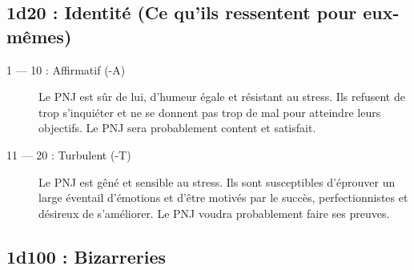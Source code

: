 \documentclass{article}
\begin{document}
\subsection*{1d20 : Identité (Ce qu'ils ressentent pour eux-mêmes)}

\begin{description}
	\item[1 --- 10 : Affirmatif (-A)] Le PNJ est sûr de lui, d'humeur égale et résistant au stress. Ils refusent de trop s'inquiéter et ne se donnent pas trop de mal pour atteindre leurs objectifs. Le PNJ sera probablement content et satisfait.
	\item[11 --- 20 : Turbulent (-T)] Le PNJ est gêné et sensible au stress. Ils sont susceptibles d'éprouver un large éventail d'émotions et d'être motivés par le succès, perfectionnistes et désireux de s'améliorer. Le PNJ voudra probablement faire ses preuves.
\end{description}


\subsection*{1d100 : Bizarreries}
\end{document}
